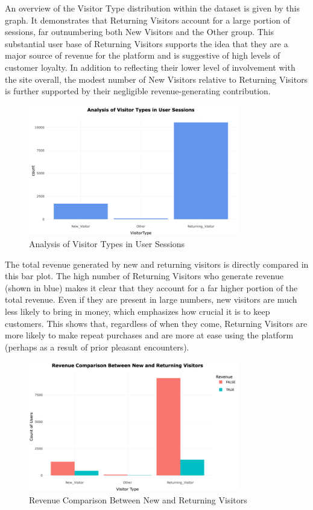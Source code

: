 \documentclass[12pt]{article}
\begin{document}
An overview of the Visitor Type distribution within the dataset is given by this graph. It demonstrates that Returning Visitors account for a large portion of sessions, far outnumbering both New Visitors and the Other group. This substantial user base of Returning Visitors supports the idea that they are a major source of revenue for the platform and is suggestive of high levels of customer loyalty. In addition to reflecting their lower level of involvement with the site overall, the modest number of New Visitors relative to Returning Visitors is further supported by their negligible revenue-generating contribution.
\begin{figure}[h]
    \centering
    \includegraphics[width=0.82\textwidth]{Analysis of Visitor Types in User Sessions.png}  
    \caption{Analysis of Visitor Types in User Sessions}
\end{figure}
\vspace{0.5cm}

\FloatBarrier
The total revenue generated by new and returning visitors is directly compared in this bar plot. The high number of Returning Visitors who generate revenue (shown in blue) makes it clear that they account for a far higher portion of the total revenue. Even if they are present in large numbers, new visitors are much less likely to bring in money, which emphasizes how crucial it is to keep customers. This shows that, regardless of when they come, Returning Visitors are more likely to make repeat purchases and are more at ease using the platform (perhaps as a result of prior pleasant encounters).

\begin{figure}[h]
    \centering
    \includegraphics[width=0.82\textwidth]{Revenue Comparison Between New and Returning Visitors.png}  
    \caption{Revenue Comparison Between New and Returning Visitors}
\end{figure}
\vspace{0.5cm}
\end{document}

